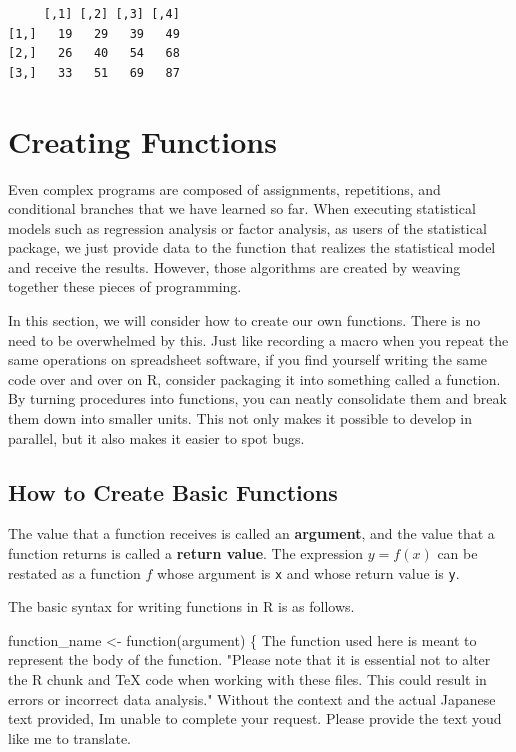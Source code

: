 \documentclass[
  a4paper,
]{book}
\newenvironment{Shaded}{\begin{snugshade}}{\end{snugshade}}
\newcommand{\ControlFlowTok}[1]{\textcolor[rgb]{0.00,0.23,0.31}{#1}}
\newcommand{\NormalTok}[1]{\textcolor[rgb]{0.00,0.23,0.31}{#1}}
\newcommand{\OtherTok}[1]{\textcolor[rgb]{0.00,0.23,0.31}{#1}}
\newcommand{\StringTok}[1]{\textcolor[rgb]{0.13,0.47,0.30}{#1}}
\begin{document}
\begin{verbatim}
     [,1] [,2] [,3] [,4]
[1,]   19   29   39   49
[2,]   26   40   54   68
[3,]   33   51   69   87
\end{verbatim}

\section{Creating Functions}\label{creating-functions}

Even complex programs are composed of assignments, repetitions, and
conditional branches that we have learned so far. When executing
statistical models such as regression analysis or factor analysis, as
users of the statistical package, we just provide data to the function
that realizes the statistical model and receive the results. However,
those algorithms are created by weaving together these pieces of
programming.

In this section, we will consider how to create our own functions. There
is no need to be overwhelmed by this. Just like recording a macro when
you repeat the same operations on spreadsheet software, if you find
yourself writing the same code over and over on R, consider packaging it
into something called a function. By turning procedures into functions,
you can neatly consolidate them and break them down into smaller units.
This not only makes it possible to develop in parallel, but it also
makes it easier to spot bugs.

\subsection{How to Create Basic
Functions}\label{how-to-create-basic-functions}

The value that a function receives is called an \textbf{argument}, and
the value that a function returns is called a \textbf{return value}. The
expression \(y=f(x)\) can be restated as a function \(f\) whose argument
is \texttt{x} and whose return value is \texttt{y}.

The basic syntax for writing functions in R is as follows.

\begin{Shaded}
\begin{Highlighting}[]
\NormalTok{function\_name }\OtherTok{\textless{}{-}} \ControlFlowTok{function}\NormalTok{(argument) \{}
\NormalTok{The }\ControlFlowTok{function}\NormalTok{ used here is meant to represent the body of the function.}
\StringTok{"Please note that it is essential not to alter the R chunk and TeX code when working with these files. This could result in errors or incorrect data analysis."}
\NormalTok{Without the context and the actual Japanese text provided, I}\StringTok{\textquotesingle{}m unable to complete your request. Please provide the text you\textquotesingle{}}\NormalTok{d like me to translate.}
\end{Highlighting}
\end{Shaded}
\end{document}
